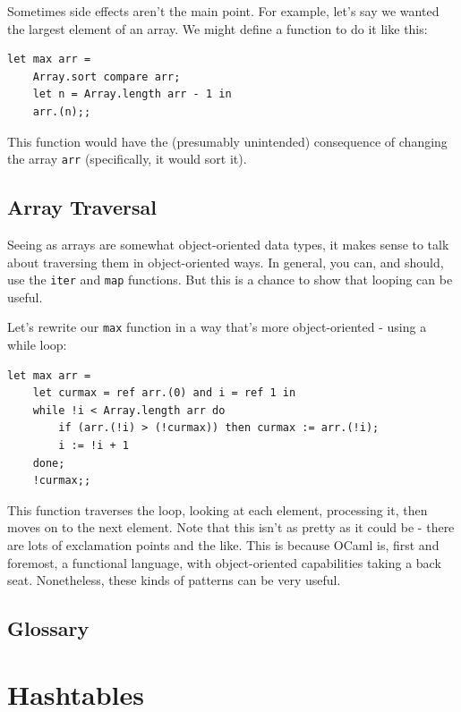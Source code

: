 \documentclass[10pt]{book}
\begin{document}
Sometimes side effects aren't the main point. For example, let's
say we wanted the largest element of an array. We might define a 
function to do it like this: 

\beforeverb
\begin{verbatim}
let max arr = 
	Array.sort compare arr;
	let n = Array.length arr - 1 in 	
	arr.(n);;
\end{verbatim}
\afterverb

This function would have the (presumably unintended) consequence of
changing the array {\tt arr} (specifically, it would sort it).

\section{Array Traversal}

Seeing as arrays are somewhat object-oriented data types, it makes sense to 
talk about traversing them in object-oriented ways. In general, you 
can, and should, use the {\tt iter} and {\tt map} functions. But this 
is a chance to show that looping can be useful.

Let's rewrite our {\tt max} function in a way that's more object-oriented - 
using a while loop:

\beforeverb
\begin{verbatim}
let max arr = 
	let curmax = ref arr.(0) and i = ref 1 in
	while !i < Array.length arr do
		if (arr.(!i) > (!curmax)) then curmax := arr.(!i);
		i := !i + 1
	done;
	!curmax;;
\end{verbatim}
\afterverb

This function traverses the loop, looking at each element, processing it,
then moves on to the next element. Note that this isn't as pretty as it 
could be - there are lots of exclamation points and the like. This is because 
OCaml is, first and foremost, a functional language, with object-oriented 
capabilities taking a back seat. Nonetheless, these kinds of patterns can be 
very useful.

\section{Glossary}

\chapter{Hashtables}

\end{document}
